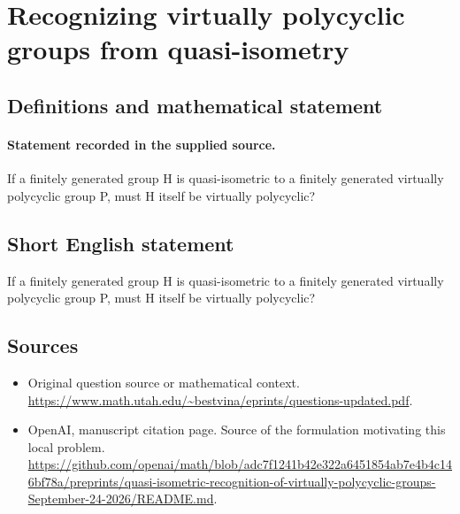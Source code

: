 \documentclass[11pt]{article}
\begin{document}
\section*{Recognizing virtually polycyclic groups from quasi-isometry}\label{30007199}
\subsection{Definitions and mathematical statement}
\paragraph{Statement recorded in the supplied source.}
If a finitely generated group H is quasi-isometric to a finitely generated virtually polycyclic group P, must H itself be virtually polycyclic?
\subsection{Short English statement}
If a finitely generated group H is quasi-isometric to a finitely generated virtually polycyclic group P, must H itself be virtually polycyclic?
\subsection{Sources}
\begin{itemize}
\item[S1] Original question source or mathematical context.
\url{https://www.math.utah.edu/~bestvina/eprints/questions-updated.pdf}.
\item[S2] OpenAI, manuscript citation page. Source of the formulation motivating this local problem.
\url{https://github.com/openai/math/blob/adc7f1241b42e322a6451854ab7e4b4c146bf78a/preprints/quasi-isometric-recognition-of-virtually-polycyclic-groups-September-24-2026/README.md}.
\end{itemize}
\end{document}
